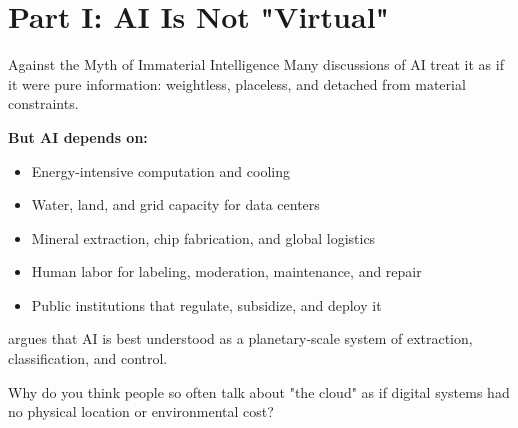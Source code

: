 \documentclass[aspectratio=169,11pt]{beamer}
\begin{document}
\section{Part I: AI Is Not "Virtual"}

\begin{frame}{Against the Myth of Immaterial Intelligence}
Many discussions of AI treat it as if it were pure information: weightless, placeless, and detached from material constraints.

\vspace{0.2cm}
\textbf{But AI depends on:}
\begin{itemize}
    \item Energy-intensive computation and cooling
    \item Water, land, and grid capacity for data centers
    \item Mineral extraction, chip fabrication, and global logistics
    \item Human labor for labeling, moderation, maintenance, and repair
    \item Public institutions that regulate, subsidize, and deploy it
\end{itemize}

\vspace{0.2cm}
\textcite{crawford_atlas_ai} argues that AI is best understood as a planetary-scale system of extraction, classification, and control.

\vspace{0.2cm}
\begin{discussionbox}
\scriptsize
Why do you think people so often talk about "the cloud" as if digital systems had no physical location or environmental cost?
\end{discussionbox}
\end{frame}
\end{document}
